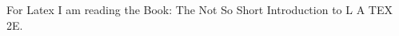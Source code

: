 \documentclass[11pt,twoside,a4paper]{report}
\begin{document}
    For Latex I am reading the Book: The Not So Short Introduction to L A TEX 2E.
\end{document}
